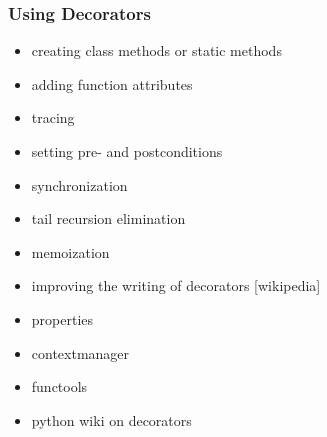 \documentclass{beamer}
\begin{document}
\begin{frame}
\frametitle{Using Decorators}
\begin{itemize}
  \item{creating class methods or static methods}
  \item{adding function attributes}
  \item{tracing}
  \item{setting pre- and postconditions}
  \item{synchronization}
  \item{tail recursion elimination}
  \item{memoization}
  \item{improving the writing of decorators [wikipedia]}
  \item{properties}
  \item{contextmanager}
  \item{functools}
  \item{python wiki on decorators}
\end{itemize}
\end{frame}



\end{document}
